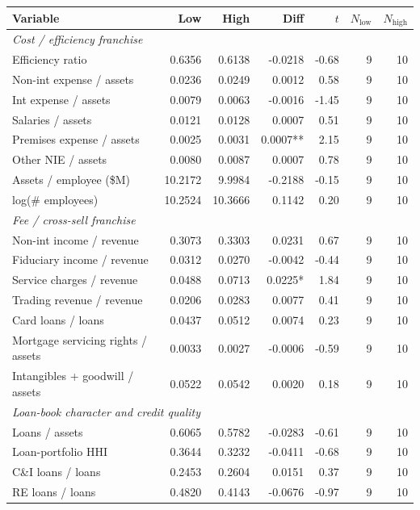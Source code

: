 \begin{tabular}{lrrrrrr}
\toprule
Variable & Low & High & Diff & $t$ & $N_{\text{low}}$ & $N_{\text{high}}$ \\
\midrule
\multicolumn{7}{l}{\emph{Cost / efficiency franchise}} \\
\midrule
Efficiency ratio & 0.6356 & 0.6138 & -0.0218 & -0.68 & 9 & 10 \\
Non-int expense / assets & 0.0236 & 0.0249 & 0.0012 & 0.58 & 9 & 10 \\
Int expense / assets & 0.0079 & 0.0063 & -0.0016 & -1.45 & 9 & 10 \\
Salaries / assets & 0.0121 & 0.0128 & 0.0007 & 0.51 & 9 & 10 \\
Premises expense / assets & 0.0025 & 0.0031 & 0.0007** & 2.15 & 9 & 10 \\
Other NIE / assets & 0.0080 & 0.0087 & 0.0007 & 0.78 & 9 & 10 \\
Assets / employee (\$M) & 10.2172 & 9.9984 & -0.2188 & -0.15 & 9 & 10 \\
log(\# employees) & 10.2524 & 10.3666 & 0.1142 & 0.20 & 9 & 10 \\
\midrule
\multicolumn{7}{l}{\emph{Fee / cross-sell franchise}} \\
\midrule
Non-int income / revenue & 0.3073 & 0.3303 & 0.0231 & 0.67 & 9 & 10 \\
Fiduciary income / revenue & 0.0312 & 0.0270 & -0.0042 & -0.44 & 9 & 10 \\
Service charges / revenue & 0.0488 & 0.0713 & 0.0225* & 1.84 & 9 & 10 \\
Trading revenue / revenue & 0.0206 & 0.0283 & 0.0077 & 0.41 & 9 & 10 \\
Card loans / loans & 0.0437 & 0.0512 & 0.0074 & 0.23 & 9 & 10 \\
Mortgage servicing rights / assets & 0.0033 & 0.0027 & -0.0006 & -0.59 & 9 & 10 \\
Intangibles + goodwill / assets & 0.0522 & 0.0542 & 0.0020 & 0.18 & 9 & 10 \\
\midrule
\multicolumn{7}{l}{\emph{Loan-book character and credit quality}} \\
\midrule
Loans / assets & 0.6065 & 0.5782 & -0.0283 & -0.61 & 9 & 10 \\
Loan-portfolio HHI & 0.3644 & 0.3232 & -0.0411 & -0.68 & 9 & 10 \\
C\&I loans / loans & 0.2453 & 0.2604 & 0.0151 & 0.37 & 9 & 10 \\
RE loans / loans & 0.4820 & 0.4143 & -0.0676 & -0.97 & 9 & 10 \\

\end{tabular}
